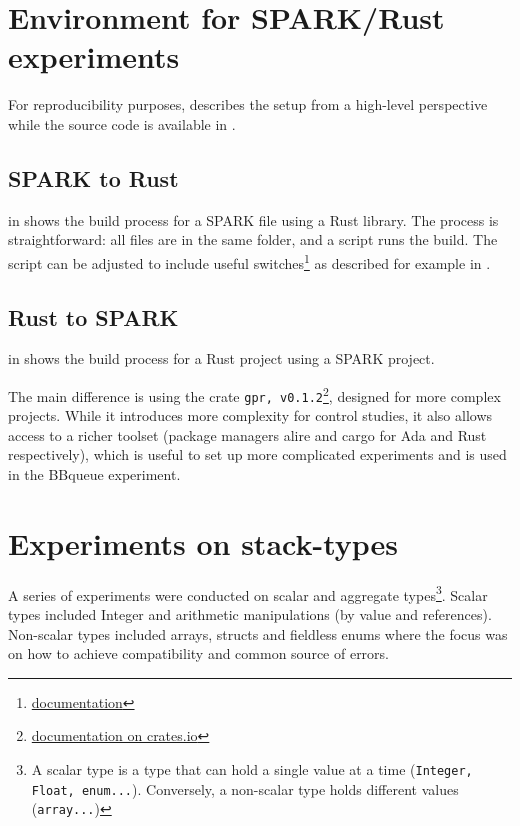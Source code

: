 \documentclass[nomenclature, english, bibtex]{kththesis}
\begin{document}
\section[Environment for \& SPARK/Rust experiments]{Environment for SPARK/Rust experiments}

For reproducibility purposes,   describes the setup from a high-level perspective while the source code is available in .

\subsection{SPARK to Rust}

 in 
shows the build process for a SPARK file using a Rust library. The process is straightforward: all files are in the same folder, and a script runs the build. The script can be adjusted to include useful switches\footnote{\href{https://docs.adacore.com/gnat_ugn-docs/html/gnat_ugn/gnat_ugn/building_executable_programs_with_gnat.html}{documentation}} as described for example in . 

\subsection{Rust to SPARK}

 in  shows the build process for a Rust project using a SPARK project. 

The main difference is using the crate \texttt{gpr, v0.1.2}\footnote{\href{https://crates.io/crates/gpr}{documentation on crates.io}}, designed for more complex projects\cite{kliemann_adding_2022}. While it introduces more complexity for control studies, it also allows access to a richer toolset (package managers alire and cargo for Ada and Rust respectively), which is useful to set up more complicated experiments and is used in the BBqueue experiment.  

\section{Experiments on stack-types}

A series of experiments were conducted on scalar and aggregate types\footnote{A scalar type is a type that can hold a single value at a time (\texttt{Integer, Float, enum...}). Conversely, a non-scalar type holds different values (\texttt{array...})}. Scalar types included Integer and arithmetic manipulations (by value and references). Non-scalar types included arrays, structs and fieldless enums where the focus was on how to achieve compatibility and common source of errors.
\end{document}
